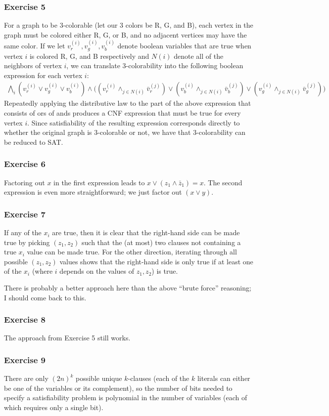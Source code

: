 \subsubsection{Exercise 5}
For a graph to be 3-colorable (let our 3 colors be R, G, and B), each vertex in the graph must be colored
either R, G, or B, and no adjacent vertices may have the same color. If we let $v_r^{(i)}, v_g^{(i)}, v_b^{(i)}$
denote boolean variables that are true when vertex $i$ is colored R, G, and B respectively and $N(i)$ denote
all of the neighbors of vertex $i$, we can translate 3-colorability into the following boolean expression
for each vertex $i$:
\begin{align*}
\bigwedge_i (v_r^{(i)} \vee v_g^{(i)} \vee v_b^{(i)}) \wedge \big((v_r^{(i)} \wedge_{j \in N(i)} \bar{v}_r^{(j)}) \vee (v_b^{(i)} \wedge_{j \in N(i)} \bar{v}_b^{(j)}) \vee (v_g^{(i)} \wedge_{j \in N(i)} \bar{v}_g^{(j)})\big)
\end{align*}
Repeatedly applying the distributive law to the part of the above expression that consists of ors of ands
produces a CNF expression that must be true for every vertex $i$. Since satisfiability of the resulting
expression corresponds directly to whether the original graph is 3-colorable or not, we have that
3-colorability can be reduced to SAT.

\subsubsection{Exercise 6}
Factoring out $x$ in the first expression leads to $x \vee (z_1 \wedge \bar{z}_1) = x$. The second expression
is even more straightforward; we just factor out $(x \vee y)$.

\subsubsection{Exercise 7}
If any of the $x_i$ are true, then it is clear that the right-hand side can be made true by picking $(z_1, z_2)$
such that the (at most) two clauses not containing a true $x_i$ value can be made true.
For the other direction, iterating through all possible $(z_1, z_2)$ values shows that the right-hand side is
only true if at least one of the $x_i$ (where $i$ depends on the values of $z_1, z_2$) is true.

There is probably a better approach here than the above ``brute force'' reasoning; I should come back to this.

\subsubsection{Exercise 8}
The approach from Exercise 5 still works.

\subsubsection{Exercise 9}
There are only $(2n)^k$ possible unique $k$-clauses (each of the $k$ literals can either be one of the 
variables or its complement), so the number of bits needed to specify a satisfiability problem is polynomial
in the number of variables (each of which requires only a single bit).
